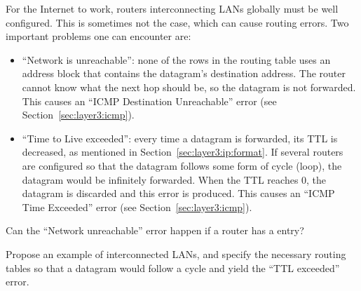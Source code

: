 For the Internet to work, routers interconnecting LANs globally must be well configured. 
This is sometimes not the case, which can cause routing errors. Two important problems 
one can encounter are:
\begin{itemize}
\item ``Network is unreachable'': none of the rows in the routing table uses an address block that contains the 
  datagram's destination address. 
  The router cannot know what the next hop should be, so the datagram is not forwarded.
  This causes an ``ICMP Destination Unreachable'' error (see Section~\ref{sec:layer3:icmp}).
  
\item ``Time to Live exceeded'': every time a datagram is forwarded,
  its TTL is decreased, as mentioned in Section~\ref{sec:layer3:ip:format}.
  If several routers are configured so that the datagram follows some form of cycle (loop), 
  the datagram would be infinitely forwarded.
  When the TTL reaches 0, the datagram is discarded and this error is produced.
  This causes an ``ICMP Time Exceeded'' error (see Section~\ref{sec:layer3:icmp}).
\end{itemize}

\begin{exercise}
Can the ``Network unreachable'' error happen if a router has a  entry?
\end{exercise}

\begin{exercise}
Propose an example of interconnected LANs, and specify the necessary routing tables so that a datagram 
would follow a cycle and yield the ``TTL exceeded'' error.
\end{exercise}

